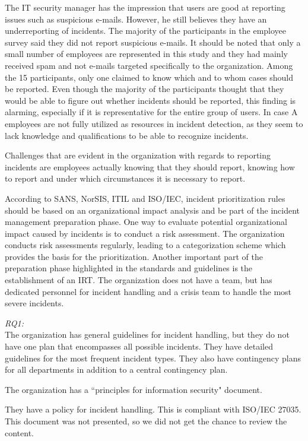The IT security manager has the impression that users are good at reporting issues such as suspicious e-mails. However, he still believes they have an underreporting of incidents. The majority of the participants in the employee survey said they did not report suspicious e-mails. It should be noted that only a small number of employees are represented in this study and they had mainly received spam and not e-mails targeted specifically to the organization. Among the 15 participants, only one claimed to know which and to whom cases should be reported. Even though the majority of the participants thought that they would be able to figure out whether incidents should be reported, this finding is alarming, especially if it is representative for the entire group of users. In case A employees are not fully utilized as resources in incident detection, as they seem to lack knowledge and qualifications to be able to recognize incidents.

Challenges that are evident in the organization with regards to reporting incidents are employees actually knowing that they should report, knowing how to report and under which circumstances it is necessary to report.

According to SANS, NorSIS, ITIL and ISO/IEC, incident prioritization rules should be based on an organizational impact analysis and be part of the incident management preparation phase. One way to evaluate potential organizational impact caused by incidents is to conduct a risk assessment. The organization conducts risk assessments regularly, leading to a categorization scheme which provides the basis for the prioritization. Another important part of the preparation phase highlighted in the standards and guidelines is the establishment of an \ac{IRT}. The organization does not have a team, but has dedicated personnel for incident handling and a crisis team to handle the most severe incidents.

\textit{RQ1:}\\
The organization has general guidelines for incident handling, but they do not have one plan that encompasses all possible incidents. They have detailed guidelines for the most frequent incident types. They also have contingency plans for all departments in addition to a central contingency plan. 

The organization has a ``principles for information security" document.


They have a policy for incident handling. This is compliant with ISO/IEC 27035. This document was not presented, so we did not get the chance to review the content.

